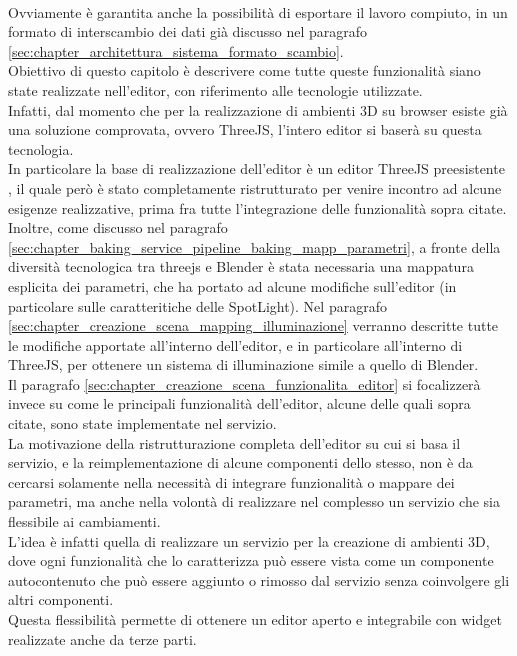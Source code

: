 \\ 
Ovviamente è garantita anche la possibilità di esportare il lavoro compiuto, in un formato di interscambio dei dati già discusso nel paragrafo \ref{sec:chapter_architettura_sistema_formato_scambio}.
\\
Obiettivo di questo capitolo è descrivere come tutte queste funzionalità siano state realizzate nell’editor, con riferimento alle tecnologie utilizzate.
\\ 
Infatti, dal momento che per la realizzazione di ambienti 3D su browser esiste già una soluzione comprovata, ovvero ThreeJS, l’intero editor si baserà su questa tecnologia.
\\
In particolare la base di realizzazione dell’editor è un editor ThreeJS preesistente \cite{editor}, il quale però è stato completamente ristrutturato per venire incontro ad alcune esigenze realizzative, prima fra tutte l’integrazione delle funzionalità sopra citate.
\\  
Inoltre, come discusso nel paragrafo \ref{sec:chapter_baking_service_pipeline_baking_mapp_parametri}, a fronte della diversità tecnologica tra threejs e Blender è stata necessaria una mappatura esplicita dei parametri, che ha portato ad alcune modifiche sull’editor (in particolare sulle caratteritiche delle SpotLight). Nel paragrafo \ref{sec:chapter_creazione_scena_mapping_illuminazione} verranno descritte tutte le modifiche apportate all’interno dell’editor, e in particolare all’interno di ThreeJS, per ottenere un sistema di illuminazione simile a quello di Blender.
\\  
Il paragrafo \ref{sec:chapter_creazione_scena_funzionalita_editor} si focalizzerà invece su come le principali funzionalità dell’editor, alcune delle quali sopra citate, sono state implementate nel servizio.
\\
La motivazione della ristrutturazione completa dell’editor su cui si basa il servizio, e la reimplementazione di alcune componenti dello stesso, non è da cercarsi solamente nella necessità di integrare funzionalità o mappare dei parametri, ma anche nella volontà di realizzare nel complesso un servizio che sia flessibile ai cambiamenti.
\\ 
L’idea è infatti quella di realizzare un servizio per la creazione di ambienti 3D, dove ogni funzionalità che lo caratterizza può essere vista come un componente autocontenuto che può essere aggiunto o rimosso dal servizio senza coinvolgere gli altri componenti.
\\
Questa flessibilità permette di ottenere un editor aperto e integrabile con widget realizzate anche da terze parti.
